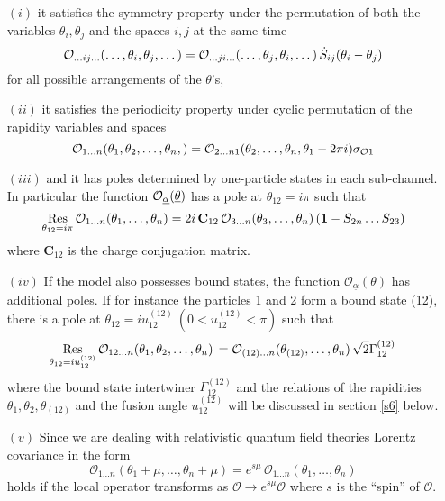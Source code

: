 \documentclass[a4paper,a4paper]{article}
\begin{document}
\begin{itemize}
\item[$(i)$]  it satisfies the symmetry property under the permutation of
both the variables $\theta _{i},\theta _{j}$ and the spaces $i,j$ at the
same time 
\[
\mathcal{O}_{\dots ij\dots }(\dots ,\theta _{i},\theta _{j},\dots )=\mathcal{%
O}_{\dots ji\dots }(\dots ,\theta _{j},\theta _{i},\dots )\,\dot{S}%
_{ij}(\theta _{i}-\theta _{j}) 
\]
for all possible arrangements of the $\theta $'s,

\item[$(ii)$]  it satisfies the periodicity property under cyclic
permutation of the rapidity variables and spaces 
\[
\mathcal{O}_{1\dots n}(\theta _{1},\theta _{2},\dots ,\theta _{n},)=\mathcal{%
O}_{2\dots n1}(\theta _{2},\dots ,\theta _{n},\theta _{1}-2\pi i)\sigma _{%
\mathcal{O}1} 
\]

\item[$(iii)$]  and it has poles determined by one-particle states in each
sub-channel. In particular the function $\mathcal{O}_{\underline{\alpha }}({%
\underline{\theta }})$ has a pole at $\theta _{12}=i\pi $ such that 
\[
\mathop{\rm Res}_{\theta _{12}=i\pi }\mathcal{O}_{1\dots n}(\theta
_{1},\dots ,\theta _{n})=2i\,\mathbf{C}_{12}\,\mathcal{O}_{3\dots n}(\theta
_{3},\dots ,\theta _{n})\left( \mathbf{1}-S_{2n}\dots S_{23}\right) 
\]
where $\mathbf{C}_{12}$ is the charge conjugation matrix.

\item[$(iv)$]  \label{iv}If the model also possesses bound states, the
function $\mathcal{O}_{\underline{\alpha }}({\underline{\theta }})$ has
additional poles. If for instance the particles 1 and 2 form a bound state
(12), there is a pole at $\theta _{12}=iu_{12}^{(12)}~(0<u_{12}^{(12)}<\pi )$
such that 
\[
\mathop{\rm Res}_{\theta _{12}=iu_{12}^{(12)}}\mathcal{O}_{12\dots n}(\theta
_{1},\theta _{2},\dots ,\theta _{n})\,=\mathcal{O}_{(12)\dots n}(\theta
_{(12)},\dots ,\theta _{n})\,\sqrt{2}\Gamma _{12}^{(12)}\, 
\]
where the bound state intertwiner $\Gamma _{12}^{(12)}$ and the relations of
the rapidities $\theta _{1},\theta _{2},\theta _{(12)}$ and the fusion angle 
$u_{12}^{(12)}$ will be discussed in section \ref{s6} below.

\item[$(v)$]  Since we are dealing with relativistic quantum field theories
Lorentz covariance in the form 
\[
\mathcal{O}_{1\dots n}(\theta _{1}+\mu ,\dots ,\theta _{n}+\mu )=e^{s\mu }\,%
\mathcal{O}_{1\dots n}(\theta _{1},\dots ,\theta _{n}) 
\]
holds if the local operator transforms as $\mathcal{O}\to e^{s\mu }\mathcal{O%
}$ where $s$ is the ``spin'' of $\mathcal{O}$.
\end{itemize}
\end{document}
